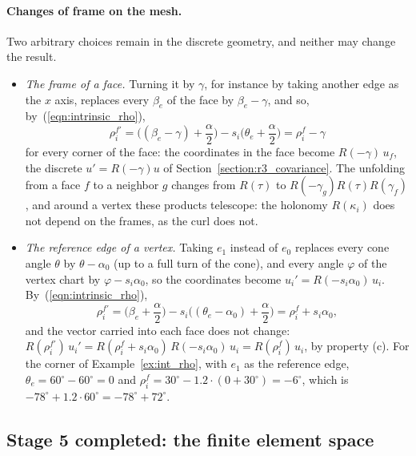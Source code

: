 \paragraph{Changes of frame on the mesh.} Two arbitrary choices remain in the discrete geometry, and neither may change the result.
\begin{itemize}
\item \emph{The frame of a face.} Turning it by $\gamma$, for instance by taking another edge as the $x$ axis, replaces every $\beta_e$ of the face by $\beta_e - \gamma$, and so, by~(\ref{eqn:intrinsic_rho}),
\begin{equation*}
\rho_i^{f\prime} = \Big((\beta_e - \gamma) + \frac\alpha2\Big) - s_i\Big(\theta_e + \frac\alpha2\Big) = \rho_i^f - \gamma
\end{equation*}
for every corner of the face: the coordinates in the face become $R(-\gamma)\,u_f$, the discrete $u' = R(-\gamma)u$ of Section~\ref{section:r3_covariance}. The unfolding from a face $f$ to a neighbor $g$ changes from $R(\tau)$ to $R(-\gamma_g)R(\tau)R(\gamma_f)$, and around a vertex these products telescope: the holonomy $R(\kappa_i)$ does not depend on the frames, as the curl does not.
\item \emph{The reference edge of a vertex.} Taking $e_1$ instead of $e_0$ replaces every cone angle $\theta$ by $\theta - \alpha_0$ (up to a full turn of the cone), and every angle $\varphi$ of the vertex chart by $\varphi - s_i\alpha_0$, so the coordinates become $u_i' = R(-s_i\alpha_0)\,u_i$. By~(\ref{eqn:intrinsic_rho}),
\begin{equation*}
\rho_i^{f\prime} = \Big(\beta_e + \frac\alpha2\Big) - s_i\Big((\theta_e - \alpha_0) + \frac\alpha2\Big) = \rho_i^f + s_i\alpha_0 ,
\end{equation*}
and the vector carried into each face does not change: $R(\rho_i^{f\prime})\,u_i' = R(\rho_i^f + s_i\alpha_0)\,R(-s_i\alpha_0)\,u_i = R(\rho_i^f)\,u_i$, by property (c). For the corner of Example~\ref{ex:int_rho}, with $e_1$ as the reference edge, $\theta_e = 60^\circ - 60^\circ = 0$ and $\rho_i^f = 30^\circ - 1.2 \cdot (0 + 30^\circ) = -6^\circ$, which is $-78^\circ + 1.2\cdot 60^\circ = -78^\circ + 72^\circ$.
\end{itemize}

\subsection{Stage 5 completed: the finite element space}
\label{section:r3_space}

